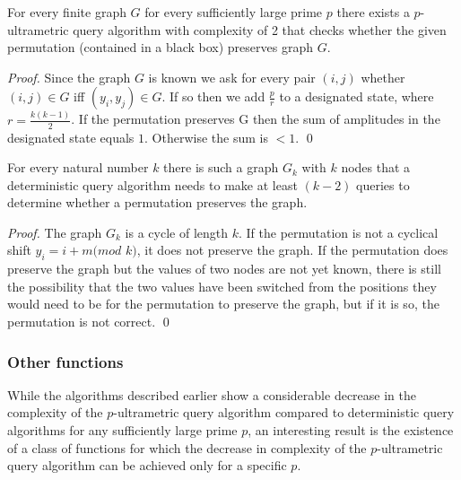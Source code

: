 \documentclass{llncs}
\begin{document}
\begin{theorem}
For every finite graph $G$ for every sufficiently large prime $p$ there exists a $p$-ultrametric query algorithm with complexity of 2 that checks whether the given permutation (contained in a black box) preserves graph $G$.
\end{theorem}
\begin{proof}
Since the graph $G$ is known we ask for every pair $(i,j)$ whether $(i,j)\in G$ iff $(y_i, y_j)\in G$. If so then we add $\frac{p}{r}$ to a designated state, where $r=\frac{k(k-1)}{2}$. If the permutation preserves G then the sum of amplitudes in the designated state equals $1$. Otherwise the sum is $<1$.
\qed
\end{proof}

\begin{theorem}
For every natural number $k$ there is such a graph $G_k$ with $k$ nodes that a deterministic query algorithm needs to make at least $(k-2)$ queries to determine whether a permutation preserves the graph.
\end{theorem}
\begin{proof}
The graph $G_k$ is a cycle of length $k$. If the permutation is not a cyclical shift $y_i = i+m(mod$ $k)$, it does not preserve the graph. If the permutation does preserve the graph but the values of two nodes are not yet known, there is still the possibility that the two values have been switched from the positions they would need to be for the permutation to preserve the graph, but if it is so, the permutation is not correct.
\qed
\end{proof}

\subsubsection{Other functions}
While the algorithms described earlier show a considerable decrease in the complexity of the $p$-ultrametric query algorithm compared to deterministic query algorithms for any sufficiently large prime $p$, an interesting result is the existence of a class of functions for which the decrease in complexity of the $p$-ultrametric query algorithm can be achieved only for a specific $p$.
\end{document}
